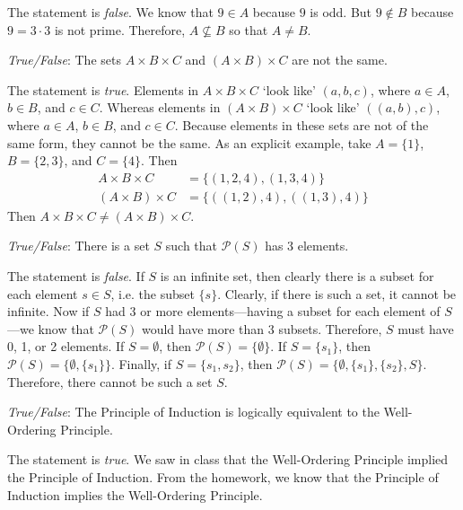\documentclass[11pt,letterpaper]{article}
\begin{document}
\sol The statement is \textit{false}. We know that $9 \in A$ because $9$ is odd. But $9 \notin B$ because $9= 3 \cdot 3$ is not prime. Therefore, $A \not\subseteq B$ so that $A \neq B$. \pvspace{1.5cm}



\quizsol \textit{True/False}: The sets $A \times B \times C$ and $(A \times B) \times C$ are not the same. \pspace

\sol The statement is \textit{true}. Elements in $A \times B \times C$ `look like' $(a, b, c)$, where $a \in A$, $b \in B$, and $c \in C$. Whereas elements in $(A \times B) \times C$ `look like' $((a, b), c)$, where $a \in A$, $b \in B$, and $c \in C$. Because elements in these sets are not of the same form, they cannot be the same. As an explicit example, take $A= \{ 1 \}$, $B= \{ 2, 3 \}$, and $C= \{ 4 \}$. Then 
	\[
	\begin{aligned}
	A \times B \times C&= \{ (1, 2, 4), (1, 3, 4) \} \\
	(A \times B) \times C&= \{ ((1, 2), 4), ((1, 3), 4) \}
	\end{aligned}
	\]
Then $A \times B \times C \neq (A \times B) \times C$. 



\newpage



\quizsol \textit{True/False}: There is a set $S$ such that $\mathcal{P}(S)$ has 3 elements. \pspace

\sol The statement is \textit{false}. If $S$ is an infinite set, then clearly there is a subset for each element $s \in S$, i.e. the subset $\{ s \}$. Clearly, if there is such a set, it cannot be infinite. Now if $S$ had 3 or more elements---having a subset for each element of $S$---we know that $\mathcal{P}(S)$ would have more than 3 subsets. Therefore, $S$ must have 0, 1, or 2 elements. If $S= \emptyset$, then $\mathcal{P}(S)= \{ \emptyset \}$. If $S= \{ s_1 \}$, then $\mathcal{P}(S)= \{ \emptyset, \{ s_1 \} \}$. Finally, if $S= \{ s_1, s_2 \}$, then $\mathcal{P}(S)= \{ \emptyset, \{ s_1 \}, \{ s_2 \}, S \}$. Therefore, there cannot be such a set $S$. \pvspace{1.5cm}



\quizsol \textit{True/False}: The Principle of Induction is logically equivalent to the Well-Ordering Principle. \pspace

\sol The statement is \textit{true}. We saw in class that the Well-Ordering Principle implied the Principle of Induction. From the homework, we know that the Principle of Induction implies the Well-Ordering Principle. \pvspace{1.5cm}
\end{document}
